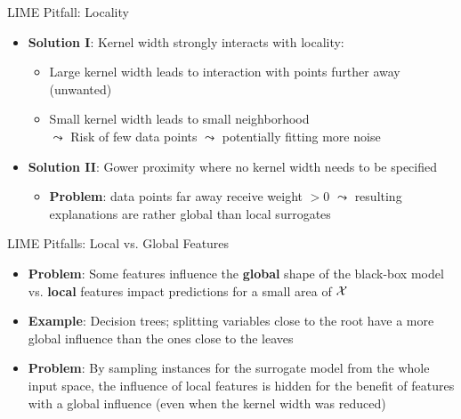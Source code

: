 \documentclass[11pt,compress,t,notes=noshow, aspectratio=169, xcolor=table]{beamer}
\begin{document}
\begin{vbframe}[c]{LIME Pitfall: Locality }
    \begin{itemize} 
         \item \textbf{Solution I}: Kernel width strongly interacts with locality:
         \begin{itemize}
             \item Large kernel width leads to interaction with points further away (unwanted)
             \item Small kernel width leads to small neighborhood\\
             $\leadsto$ Risk of few data points $\leadsto$ potentially fitting more noise
         \end{itemize}
    	\item \textbf{Solution II}: Gower proximity where no kernel width needs to be specified 
    	\begin{itemize}
    	    \item \textbf{Problem}: data points far away receive weight $ > 0$ $\leadsto$ resulting explanations are rather global than local surrogates   
    	\end{itemize}
    \end{itemize}
\vspace{0.3cm}

\end{vbframe}

\begin{vbframe}[c]{LIME Pitfalls: Local vs. Global Features }

\begin{itemize}
	\item \textbf{Problem}: Some features influence the \textbf{global} shape of the black-box model vs. \textbf{local} features impact predictions for a small area of $\Xspace$ 
	\item \textbf{Example}: Decision trees; splitting variables close to the root have a more global influence than the ones close to the leaves
	\item \textbf{Problem}: By sampling instances for the surrogate model from the whole input space, the influence of local features is hidden for the benefit of features with a global influence (even when the kernel width was reduced) 
\end{itemize}

\end{vbframe}
\end{document}
